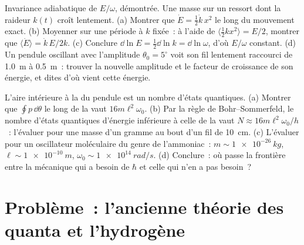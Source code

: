 \begin{exercise}[$\star\star\star$]\label{exo:b3:hamiltonian-mechanics:11}
Invariance adiabatique de $E/\omega$, démontrée. Une masse sur un
ressort dont la raideur $k(t)$ croît lentement. (a) Montrer que $\dot E = \tfrac12\dot k\,
x^2$ le long du mouvement exact. (b) Moyenner sur une période à $k$ fixée~:
à l'aide de $\langle\tfrac12 kx^2\rangle = E/2$, montrer que $\langle\dot E\rangle
= \dot k\,E/2k$. (c) Conclure $\dd\ln E = \tfrac12\dd\ln k = \dd\ln
\omega$, d'où $E/\omega$ constant. (d) Un pendule oscillant avec
l'amplitude $\theta_0 = 5^\circ$ voit son fil lentement raccourci de
\qty{1.0}{m} à \qty{0.5}{m}~: trouver la nouvelle amplitude et le
facteur de croissance de son énergie, et dites d'où vient cette énergie.
\end{exercise}

\begin{exercise}[$\star\star\star$]\label{exo:b3:hamiltonian-mechanics:12}
L'aire intérieure à la  du pendule est un nombre d'états
quantiques. (a) Montrer que $\oint p\,\dd\theta$ le long de la
 vaut $16m\ell^2\omega_0$. (b) Par la règle de
Bohr--Sommerfeld, le nombre d'états quantiques d'énergie inférieure à celle de la  vaut $N \approx
16m\ell^2\omega_0/h$~: l'évaluer pour une masse d'un gramme au bout
d'un fil de \qty{10}{cm}. (c) L'évaluer pour un oscillateur
moléculaire du genre de l'ammoniac~: $m \sim \qty{1e-26}{kg}$,
$\ell \sim \qty{1e-10}{m}$, $\omega_0 \sim \qty{1e14}{rad/s}$. (d)
Conclure~: où passe la frontière entre la mécanique qui a besoin de
$\hbar$ et celle qui n'en a pas besoin~?
\end{exercise}

\section{Problème~: l'ancienne théorie des quanta et l'hydrogène}

